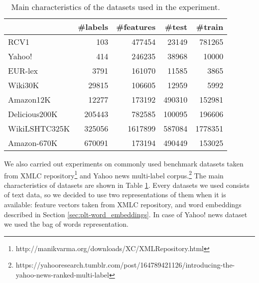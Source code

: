 \documentclass{article}
\begin{document}
{\begin{table}[t!]
\vspace{-.2cm}
        \caption{Main characteristics of the datasets used in the experiment.}
        \label{tab:datasets-differences-table}
        \begin{center}
                \begin{small}
                        \begin{tabular}{l@{\hskip 4pt} | r@{\hskip 4pt} r@{\hskip 4pt} r@{\hskip 4pt} r} %
                                \toprule
& \#labels &\#features &\#test &\#train \\%
\midrule
RCV1 & 103 & 477454 & 23149 & 781265 \\%
Yahoo! & 414 & 246235 & 38968 & 10000 \\%
EUR-lex & 3791 & 161070 & 11585 & 3865 \\%
Wiki30K & 29815 & 106605 & 12959 & 5992 \\%
Amazon12K & 12277 & 173192 & 490310 & 152981 \\%
Delicious200K & 205443 & 782585 & 100095 & 196606 \\%
WikiLSHTC325K & 325056 & 1617899 & 587084 & 1778351 \\%
Amazon-670K & 670091 & 173194 & 490449 & 153025 \\%
                                \bottomrule
                        \end{tabular}
                \end{small}
        \end{center}
                        \vspace{-0.4cm}
\end{table}
%
We also carried out experiments on commonly used benchmark datasets taken from XMLC repository\footnote{http://manikvarma.org/downloads/XC/XMLRepository.html} and Yahoo news multi-label corpus.\footnote{https://yahooresearch.tumblr.com/post/164789421126/introducing-the-yahoo-news-ranked-multi-label}
The main characteristics of datasets are shown in Table \ref{tab:datasets-differences-table}. 
%
Every datasets we used consists of text data, so we decided to use two representations of them when it is available: feature vectors taken from XMLC repository, and word embeddings described in Section \ref{sec:plt-word_embeddings}. In case of Yahoo! news dataset we used the bag of words representation.

}
\end{document}
